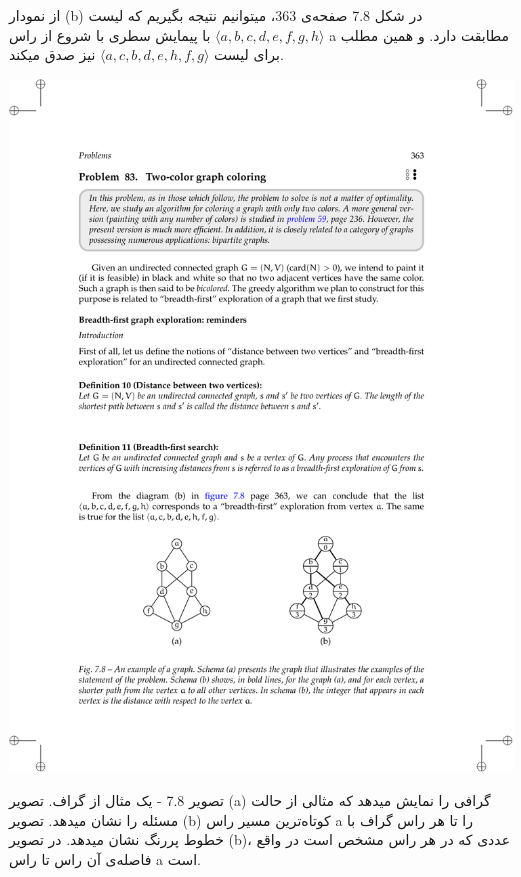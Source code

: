 \documentclass{book} %
\newcommand{\imgcaption}[1]{\color[HTML]{4F4D4D}\footnotesize{#1}}
\begin{document}
از نمودار (b) در شکل 7.8 صفحه‌ی 363، میتوانیم نتیجه بگیریم که لیست $⟨a, b, c, d, e, f, g, h⟩$ با پیمایش سطری با شروع از راس a مطابقت دارد. و همین مطلب برای لیست $⟨a, c, b, d, e, h, f, g⟩$ نیز صدق میکند.


\begin{center}
    \includegraphics{./fig7.8.pdf}

\end{center}

تصویر 7.8 - یک مثال از گراف. تصویر (a) گرافی را نمایش میدهد که مثالی از حالت مسئله را نشان میدهد.  تصویر (b) کوتاه‌ترین مسیر راس a را تا هر راس گراف با خطوط پررنگ نشان میدهد. در تصویر (b)، عددی که در هر راس مشخص است در واقع فاصله‌ی آن راس تا راس a است.



\newpage
\end{document}
